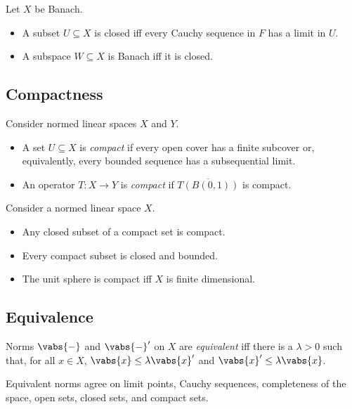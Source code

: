 \documentclass{article}
\begin{document}
\begin{theorem}
  Let $X$ be Banach.
  \begin{itemize}
    \item A subset $U\subseteq X$ is closed iff every Cauchy sequence in $F$ has
      a limit in $U$.
    \item A subspace $W\subseteq X$ is Banach iff it is closed.
  \end{itemize}
\end{theorem}

\subsection{Compactness}

\begin{definition}
  Consider normed linear spaces $X$ and $Y$.
  \begin{itemize}
    \item A set $U\subseteq X$ is \emph{compact} if every open cover
      has a finite subcover or, equivalently, every bounded sequence has
      a subsequential limit.
    \item An operator $T:X\to Y$ is \emph{compact} if
      $\overline{T(B(0,1))}$ is compact.
  \end{itemize}
\end{definition}

\begin{theorem}
  Consider a normed linear space $X$.
  \begin{itemize}
    \item Any closed subset of a compact set is compact.
    \item Every compact subset is closed and bounded.
    \item The unit sphere is compact iff $X$ is finite dimensional.
  \end{itemize}
\end{theorem}

\subsection{Equivalence}

\begin{definition}
  Norms $\vabs{-}$ and $\vabs{-}'$ on $X$ are \emph{equivalent} iff
  there is a $\lambda>0$ such that, for all $x\in X$,
  $\vabs{x}\leq \lambda\vabs{x}'$ and $\vabs{x}'\leq \lambda\vabs{x}$.
\end{definition}

\begin{lemma}
  Equivalent norms agree on limit points, Cauchy sequences, completeness of
  the space, open sets, closed sets, and compact sets.
\end{lemma}
\end{document}
